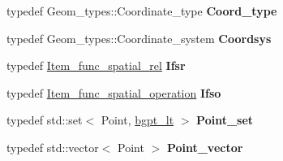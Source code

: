 \begin{DoxyCompactItemize}
typedef Geom\+\_\+types\+::\+Coordinate\+\_\+type {\bfseries Coord\+\_\+type}
\item 
\mbox{\label{classBG__setop__wrapper_a034f9618d4eada6adb3a1a51640e4201}} 
typedef Geom\+\_\+types\+::\+Coordinate\+\_\+system {\bfseries Coordsys}
\item 
\mbox{\label{classBG__setop__wrapper_aa10ada6ba082a5b783c77eaf55314bff}} 
typedef \mbox{\hyperlink{classItem__func__spatial__rel}{Item\+\_\+func\+\_\+spatial\+\_\+rel}} {\bfseries Ifsr}
\item 
\mbox{\label{classBG__setop__wrapper_a8c415cc06c7c7aa19c7c084e0ba3e761}} 
typedef \mbox{\hyperlink{classItem__func__spatial__operation}{Item\+\_\+func\+\_\+spatial\+\_\+operation}} {\bfseries Ifso}
\item 
\mbox{\label{classBG__setop__wrapper_a963023e17f046b209a520e510fd83f3d}} 
typedef std\+::set$<$ Point, \mbox{\hyperlink{structbgpt__lt}{bgpt\+\_\+lt}} $>$ {\bfseries Point\+\_\+set}
\item 
\mbox{\label{classBG__setop__wrapper_a79e40bab78c6b613929b37f922b357b3}} 
typedef std\+::vector$<$ Point $>$ {\bfseries Point\+\_\+vector}
\end{DoxyCompactItemize}
